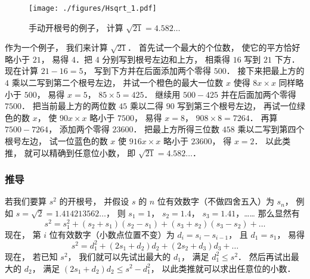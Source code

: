 
\begin{example}{}
\begin{figure}[ht]
\centering
\texttt{[image: ./figures/Hsqrt\_1.pdf]}
\caption{手动开根号的例子， 计算 $\sqrt{21} = 4.582\dots$} \label{Hsqrt_fig1}
\end{figure}
作为一个例子， 我们来计算 $\sqrt{21}$． 首先试一个最大的个位数， 使它的平方恰好略小于 $21$， 易得 $4$．把 $4$ 分别写到根号左边和上方， 相乘得 $16$ 写到 $21$ 下方． 现在计算 $21-16 = 5$， 写到下方并在后面添加两个零得 $500$． 接下来把最上方的 $4$ 乘以二写到第二个根号左边， 并试一个橙色的最大一位数 $x$ 使得 $8x\times x$ 同样略小于 $500$， 易得 $x = 5$， $85\times 5 = 425$． 继续用 $500-425$ 并在后面加两个零得 $7500$． 把当前最上方的两位数 $45$ 乘以二得 $90$ 写到第三个根号左边， 再试一位绿色的数 $x$， 使 $90 x\times x$ 略小于 $7500$， 易得 $x = 8$， $908\times 8 = 7264$． 再算 $7500-7264$， 添加两个零得 $23600$． 把最上方所得三位数 $458$ 乘以二写到第四个根号左边， 试一位蓝色的数 $x$ 使 $916x\times x$ 略小于 $23600$， 得 $x = 2$． 以此类推， 就可以精确到任意位小数， 即 $\sqrt{21} = 4.582\dots$．
\end{example}

\subsubsection{推导}
若我们要算 $s^2$ 的开根号， 并假设 $s$ 的 $n$ 位有效数字（不做四舍五入）为 $s_n$， 例如 $s = \sqrt{2} = 1.414213562\dots$， 则 $s_1 = 1$， $s_2=1.4$， $s_3=1.41$，…… 那么显然有
\begin{equation}
s^2 = s_1^2 + (s_2+s_1)(s_2-s_1) + (s_3+s_2)(s_3-s_2) + \dots
\end{equation}
现在， 第 $i$ 位有效数字（小数点位置不变）为 $d_i = s_i-s_{i-1}$， 且 $d_1 = s_1$， 易得
\begin{equation}
s^2 = d_1^2 + (2s_1 + d_2)d_2 + (2s_2 + d_3)d_3 + \dots
\end{equation}
现在， 若已知 $s^2$， 我们就可以先试出最大的 $d_1$， 满足 $d_1^2\leqslant s^2$． 然后再试出最大的 $d_2$， 满足 $(2s_1 + d_2)d_2 \leqslant s^2 - d_1^2$， 以此类推就可以求出任意位的小数．
